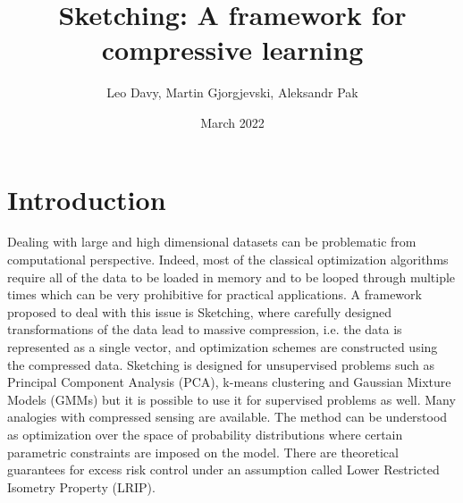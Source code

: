 \documentclass{article}
\title{Sketching: A framework for compressive learning}
\author{Leo Davy, Martin Gjorgjevski, Aleksandr Pak}
\date{March 2022}
\begin{document}
\maketitle

\section{Introduction}

Dealing with large and high dimensional datasets can be problematic from computational perspective. Indeed, most of the classical optimization algorithms require all of the data to be loaded in memory and to be looped through multiple times which can be very prohibitive for practical applications. A framework proposed to deal with this issue is Sketching, where  carefully designed transformations of the data lead to massive compression, i.e. the data is represented as a single vector, and optimization schemes are constructed using the compressed data.
\newline
Sketching is designed for unsupervised problems such as Principal Component Analysis (PCA), k-means clustering and Gaussian Mixture Models (GMMs) but it is possible to use it for supervised problems as well.
\newline
Many analogies with compressed sensing are available. The method can be understood as optimization over the space of probability distributions where certain parametric constraints are imposed on the model. There are theoretical guarantees for excess risk control under an assumption called Lower Restricted Isometry Property (LRIP).
\end{document}
